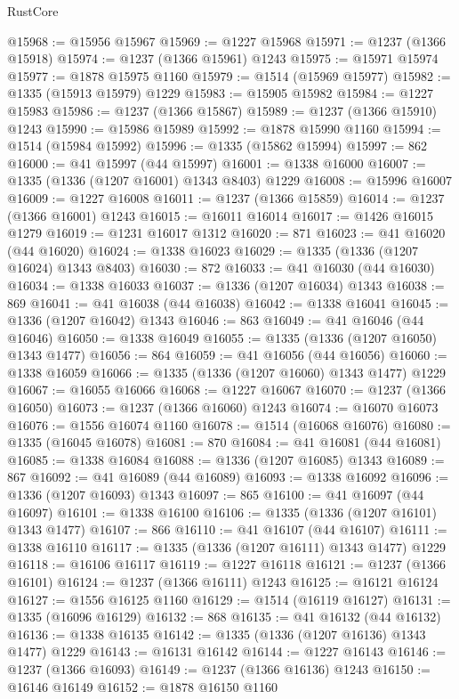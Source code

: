 \begin{lexlean}{RustCore}
\begin{coremodule}
@15968 := @15956 @15967
@15969 := @1227 @15968
@15971 := @1237 (@1366 @15918)
@15974 := @1237 (@1366 @15961) @1243
@15975 := @15971 @15974
@15977 := @1878 @15975 @1160
@15979 := @1514 (@15969 @15977)
@15982 := @1335 (@15913 @15979) @1229
@15983 := @15905 @15982
@15984 := @1227 @15983
@15986 := @1237 (@1366 @15867)
@15989 := @1237 (@1366 @15910) @1243
@15990 := @15986 @15989
@15992 := @1878 @15990 @1160
@15994 := @1514 (@15984 @15992)
@15996 := @1335 (@15862 @15994)
@15997 := 862
@16000 := @41 @15997 (@44 @15997)
@16001 := @1338 @16000
@16007 := @1335 (@1336 (@1207 @16001) @1343 @8403) @1229
@16008 := @15996 @16007
@16009 := @1227 @16008
@16011 := @1237 (@1366 @15859)
@16014 := @1237 (@1366 @16001) @1243
@16015 := @16011 @16014
@16017 := @1426 @16015 @1279
@16019 := @1231 @16017 @1312
@16020 := 871
@16023 := @41 @16020 (@44 @16020)
@16024 := @1338 @16023
@16029 := @1335 (@1336 (@1207 @16024) @1343 @8403)
@16030 := 872
@16033 := @41 @16030 (@44 @16030)
@16034 := @1338 @16033
@16037 := @1336 (@1207 @16034) @1343
@16038 := 869
@16041 := @41 @16038 (@44 @16038)
@16042 := @1338 @16041
@16045 := @1336 (@1207 @16042) @1343
@16046 := 863
@16049 := @41 @16046 (@44 @16046)
@16050 := @1338 @16049
@16055 := @1335 (@1336 (@1207 @16050) @1343 @1477)
@16056 := 864
@16059 := @41 @16056 (@44 @16056)
@16060 := @1338 @16059
@16066 := @1335 (@1336 (@1207 @16060) @1343 @1477) @1229
@16067 := @16055 @16066
@16068 := @1227 @16067
@16070 := @1237 (@1366 @16050)
@16073 := @1237 (@1366 @16060) @1243
@16074 := @16070 @16073
@16076 := @1556 @16074 @1160
@16078 := @1514 (@16068 @16076)
@16080 := @1335 (@16045 @16078)
@16081 := 870
@16084 := @41 @16081 (@44 @16081)
@16085 := @1338 @16084
@16088 := @1336 (@1207 @16085) @1343
@16089 := 867
@16092 := @41 @16089 (@44 @16089)
@16093 := @1338 @16092
@16096 := @1336 (@1207 @16093) @1343
@16097 := 865
@16100 := @41 @16097 (@44 @16097)
@16101 := @1338 @16100
@16106 := @1335 (@1336 (@1207 @16101) @1343 @1477)
@16107 := 866
@16110 := @41 @16107 (@44 @16107)
@16111 := @1338 @16110
@16117 := @1335 (@1336 (@1207 @16111) @1343 @1477) @1229
@16118 := @16106 @16117
@16119 := @1227 @16118
@16121 := @1237 (@1366 @16101)
@16124 := @1237 (@1366 @16111) @1243
@16125 := @16121 @16124
@16127 := @1556 @16125 @1160
@16129 := @1514 (@16119 @16127)
@16131 := @1335 (@16096 @16129)
@16132 := 868
@16135 := @41 @16132 (@44 @16132)
@16136 := @1338 @16135
@16142 := @1335 (@1336 (@1207 @16136) @1343 @1477) @1229
@16143 := @16131 @16142
@16144 := @1227 @16143
@16146 := @1237 (@1366 @16093)
@16149 := @1237 (@1366 @16136) @1243
@16150 := @16146 @16149
@16152 := @1878 @16150 @1160

\end{coremodule}
\end{lexlean}
